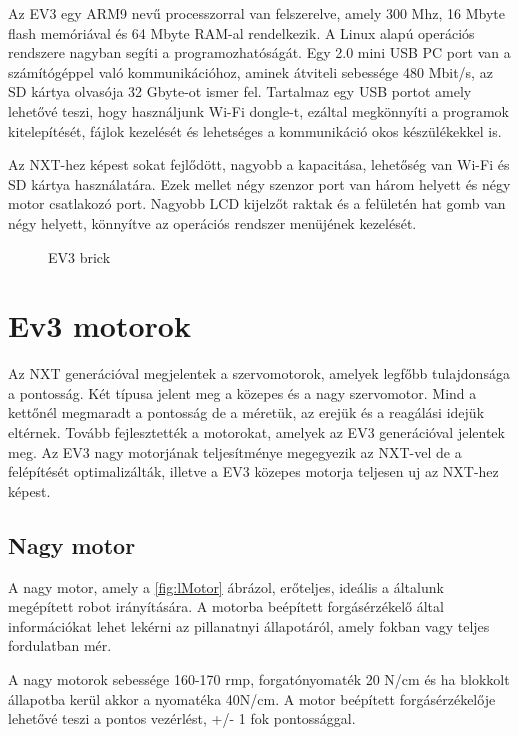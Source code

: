 Az EV3 egy ARM9 nevű processzorral van felszerelve, amely 300 Mhz, 16 Mbyte flash memóriával és 64 Mbyte RAM-al rendelkezik. A Linux alapú operációs rendszere nagyban segíti a programozhatóságát. Egy 2.0 mini USB PC port van a számítógéppel való kommunikációhoz, aminek átviteli sebessége 480 Mbit/s, az SD kártya olvasója 32 Gbyte-ot ismer fel. Tartalmaz egy USB portot amely lehetővé teszi, hogy használjunk Wi-Fi dongle-t, ezáltal megkönnyíti a programok kitelepítését, fájlok kezelését és lehetséges a kommunikáció okos készülékekkel is.

Az NXT-hez képest sokat fejlődött, nagyobb a kapacitása, lehetőség van Wi-Fi és SD kártya használatára. Ezek mellet négy szenzor port van három helyett és négy motor csatlakozó port. Nagyobb LCD kijelzőt raktak és a felületén hat gomb van négy helyett, könnyítve az operációs rendszer menüjének kezelését.

\begin{figure}[!htb]
	\label{fig:EV3}
	\centering
	\caption{EV3 brick}
\end{figure}


\section{Ev3 motorok}\label{sec:ROBOT:motorok}
Az NXT generációval megjelentek a szervomotorok, amelyek legfőbb tulajdonsága a pontosság. Két típusa jelent meg a közepes és a nagy szervomotor. Mind a kettőnél megmaradt a pontosság de a méretük, az erejük és a reagálási idejük eltérnek. Tovább fejlesztették a motorokat, amelyek az EV3 generációval jelentek meg. Az EV3 nagy motorjának teljesítménye megegyezik az NXT-vel de a felépítését optimalizálták, illetve a EV3 közepes motorja teljesen uj az NXT-hez képest.

\subsection{Nagy motor}
A nagy motor, amely a \ref{fig:lMotor} ábrázol, erőteljes, ideális a általunk megépített robot irányítására. A motorba beépített forgásérzékelő által  információkat lehet lekérni az pillanatnyi állapotáról, amely fokban vagy teljes fordulatban mér.

A nagy motorok sebessége 160-170 rmp, forgatónyomaték 20 N/cm és ha blokkolt állapotba kerül akkor a nyomatéka 40N/cm. A motor beépített forgásérzékelője lehetővé teszi a pontos vezérlést, +/- 1 fok pontossággal.

